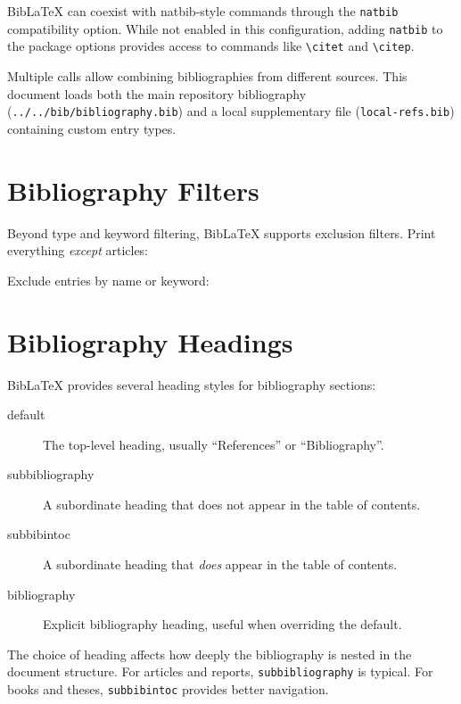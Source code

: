 \documentclass[
    language=english,
    doctype=article,
    institution=none,
]{../../omnilatex}
\begin{document}
BibLaTeX can coexist with natbib-style commands through the
\texttt{natbib} compatibility option.  While not enabled in this
configuration, adding \texttt{natbib} to the package options provides
access to commands like \verb|\citet| and \verb|\citep|.

Multiple \verb|| calls allow combining bibliographies from
different sources.  This document loads both the main repository
bibliography (\texttt{../../bib/bibliography.bib}) and a local
supplementary file (\texttt{local-refs.bib}) containing custom entry types.

\section{Bibliography Filters}
\label{sec:filters}

Beyond type and keyword filtering, BibLaTeX supports exclusion filters.
Print everything \emph{except} articles:
\printbibliography[nottype=article,heading=subbibliography,title={Non-Article Entries}]

Exclude entries by name or keyword:
\printbibliography[notkeyword=reference,heading=subbibliography,title={Non-Reference Entries}]

\section{Bibliography Headings}
\label{sec:headings}

BibLaTeX provides several heading styles for bibliography sections:

\begin{description}
    \item[default] The top-level heading, usually ``References'' or
        ``Bibliography''.
    \item[subbibliography] A subordinate heading that does not appear in
        the table of contents.
    \item[subbibintoc] A subordinate heading that \emph{does} appear in
        the table of contents.
    \item[bibliography] Explicit bibliography heading, useful when
        overriding the default.
\end{description}

The choice of heading affects how deeply the bibliography is nested in the
document structure.  For articles and reports, \texttt{subbibliography} is
typical.  For books and theses, \texttt{subbibintoc} provides better
navigation.
\end{document}
